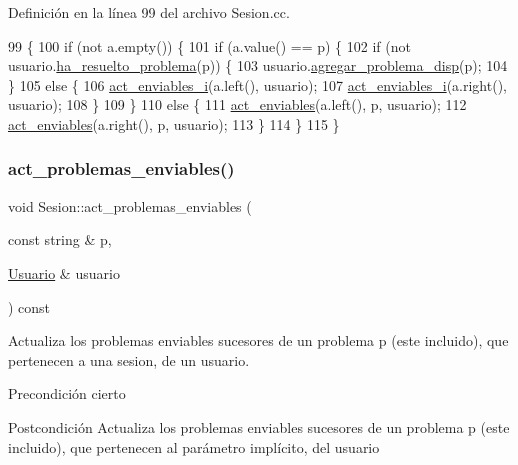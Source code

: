 Definición en la línea 99 del archivo Sesion.\+cc.


\begin{DoxyCode}
99                                                                                             \{
100         \textcolor{keywordflow}{if} (not a.empty()) \{
101           \textcolor{keywordflow}{if} (a.value() == p) \{
102             \textcolor{keywordflow}{if} (not usuario.\mbox{\hyperlink{class_usuario_a6f9608eac6a6a05d850dcad07bdf37f3}{ha\_resuelto\_problema}}(p)) \{
103               usuario.\mbox{\hyperlink{class_usuario_a4dedcdcfe3d1769d6d2106d9fb2f7e51}{agregar\_problema\_disp}}(p);
104             \}
105             \textcolor{keywordflow}{else} \{
106               \mbox{\hyperlink{class_sesion_ad391d505577569f30635f19a0f36c9a0}{act\_enviables\_i}}(a.left(), usuario);
107               \mbox{\hyperlink{class_sesion_ad391d505577569f30635f19a0f36c9a0}{act\_enviables\_i}}(a.right(), usuario);
108             \}
109           \}
110           \textcolor{keywordflow}{else} \{
111             \mbox{\hyperlink{class_sesion_a7e64b66ecf1ad363dd0c394ec59eaa91}{act\_enviables}}(a.left(), p, usuario);
112             \mbox{\hyperlink{class_sesion_a7e64b66ecf1ad363dd0c394ec59eaa91}{act\_enviables}}(a.right(), p, usuario);
113           \}
114         \}
115       \}
\end{DoxyCode}
\mbox{\label{class_sesion_a0fc0dfafa8e3bd98e7d18dff68eb82f2}} 
\subsubsection{\texorpdfstring{act\+\_\+problemas\+\_\+enviables()}{act\_problemas\_enviables()}}
{\footnotesize\ttfamily void Sesion\+::act\+\_\+problemas\+\_\+enviables (\begin{DoxyParamCaption}\item[{const string \&}]{p,  }\item[{\mbox{\hyperlink{class_usuario}{Usuario}} \&}]{usuario }\end{DoxyParamCaption}) const}



Actualiza los problemas enviables sucesores de un problema p (este incluido), que pertenecen a una sesion, de un usuario. 

\begin{DoxyPrecond}{Precondición}
cierto 
\end{DoxyPrecond}
\begin{DoxyPostcond}{Postcondición}
Actualiza los problemas enviables sucesores de un problema p (este incluido), que pertenecen al parámetro implícito, del usuario 
\end{DoxyPostcond}



